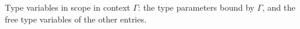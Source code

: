 Type variables in scope in context $\Gamma$: the type parameters bound by $\Gamma$, and the free type variables of
the other entries.
